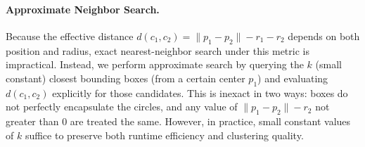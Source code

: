 \documentclass[11pt]{article}
\begin{document}
\paragraph{Approximate Neighbor Search.}
Because the effective distance $d(c_1, c_2) = \|p_1 - p_2\| - r_1 - r_2$ depends on both position and radius, exact nearest-neighbor search under this metric is impractical. Instead, we perform approximate search by querying the $k$ (small constant) closest bounding boxes (from a certain center $p_1$) and evaluating $d(c_1, c_2)$ explicitly for those candidates. This is inexact in two ways: boxes do not perfectly encapsulate the circles, and any value of $\|p_1 - p_2\| - r_2$ not greater than $0$ are treated the same. However, in practice, small constant values of $k$ suffice to preserve both runtime efficiency and clustering quality.
\end{document}
